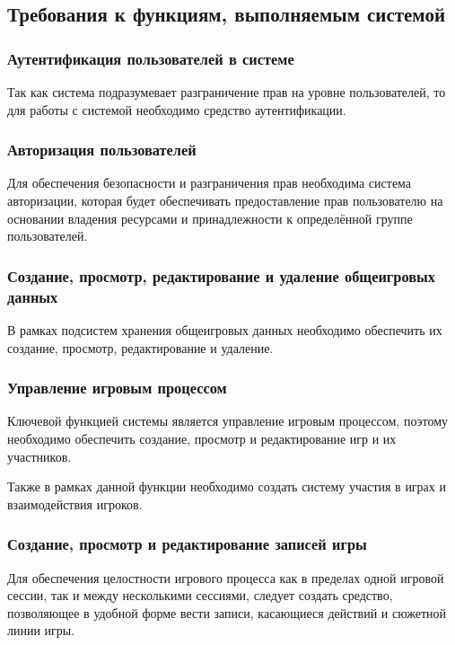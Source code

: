 \subsection{Требования к функциям, выполняемым системой}
\label{sec:specification:functional_requirements}


\subsubsection{Аутентификация пользователей в системе}

Так как система подразумевает разграничение прав на уровне пользователей, то для работы с системой необходимо средство аутентификации.


\subsubsection{Авторизация пользователей}

Для обеспечения безопасности и разграничения прав необходима система авторизации, которая будет обеспечивать предоставление прав пользователю на основании владения ресурсами и принадлежности к определённой группе пользователей.


\subsubsection{Создание, просмотр, редактирование и удаление общеигровых данных}

В рамках подсистем хранения общеигровых данных необходимо обеспечить их создание, просмотр, редактирование и удаление.


\subsubsection{Управление игровым процессом}

Ключевой функцией системы является управление игровым процессом, поэтому необходимо обеспечить создание, просмотр и редактирование игр и их участников.

Также в рамках данной функции необходимо создать систему участия в играх и взаимодействия игроков.


\subsubsection{Создание, просмотр и редактирование записей игры}

Для обеспечения целостности игрового процесса как в пределах одной игровой сессии, так и между несколькими сессиями, следует создать средство, позволяющее в удобной форме вести записи, касающиеся действий и сюжетной линии игры.



